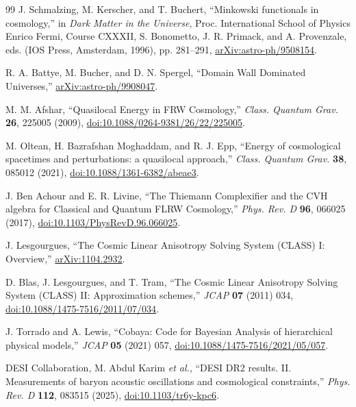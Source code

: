 \documentclass[aps,prd,reprint,onecolumn,nofootinbib,superscriptaddress,showkeys]{revtex4-2}
\numberwithin{equation}{section}
\theoremstyle{definition}
\theoremstyle{plain}
\begin{document}
\begin{thebibliography}{99}
J. Schmalzing, M. Kerscher, and T. Buchert,
``Minkowski functionals in cosmology,'' in \emph{Dark Matter in the Universe},
Proc. International School of Physics Enrico Fermi, Course CXXXII,
S. Bonometto, J. R. Primack, and A. Provenzale, eds. (IOS Press, Amsterdam, 1996), pp. 281--291,
\href{https://arxiv.org/abs/astro-ph/9508154}{arXiv:astro-ph/9508154}.

R. A. Battye, M. Bucher, and D. N. Spergel,
``Domain Wall Dominated Universes,''
\href{https://arxiv.org/abs/astro-ph/9908047}{arXiv:astro-ph/9908047}.

M. M. Afshar,
``Quasilocal Energy in FRW Cosmology,''
\emph{Class. Quantum Grav.} \textbf{26}, 225005 (2009),
\href{https://doi.org/10.1088/0264-9381/26/22/225005}{doi:10.1088/0264-9381/26/22/225005}.

M. Oltean, H. Bazrafshan Moghaddam, and R. J. Epp,
``Energy of cosmological spacetimes and perturbations: a quasilocal approach,''
\emph{Class. Quantum Grav.} \textbf{38}, 085012 (2021),
\href{https://doi.org/10.1088/1361-6382/abeae3}{doi:10.1088/1361-6382/abeae3}.

J. Ben Achour and E. R. Livine,
``The Thiemann Complexifier and the CVH algebra for Classical and Quantum FLRW Cosmology,''
\emph{Phys. Rev. D} \textbf{96}, 066025 (2017),
\href{https://doi.org/10.1103/PhysRevD.96.066025}{doi:10.1103/PhysRevD.96.066025}.

J. Lesgourgues,
``The Cosmic Linear Anisotropy Solving System (CLASS) I: Overview,''
\href{https://arxiv.org/abs/1104.2932}{arXiv:1104.2932}.

D. Blas, J. Lesgourgues, and T. Tram,
``The Cosmic Linear Anisotropy Solving System (CLASS) II: Approximation schemes,''
\emph{JCAP} \textbf{07} (2011) 034,
\href{https://doi.org/10.1088/1475-7516/2011/07/034}{doi:10.1088/1475-7516/2011/07/034}.

J. Torrado and A. Lewis,
``Cobaya: Code for Bayesian Analysis of hierarchical physical models,''
\emph{JCAP} \textbf{05} (2021) 057,
\href{https://doi.org/10.1088/1475-7516/2021/05/057}{doi:10.1088/1475-7516/2021/05/057}.

DESI Collaboration, M. Abdul Karim \emph{et al.},
``DESI DR2 results. II. Measurements of baryon acoustic oscillations and cosmological constraints,''
\emph{Phys. Rev. D} \textbf{112}, 083515 (2025),
\href{https://doi.org/10.1103/tr6y-kpc6}{doi:10.1103/tr6y-kpc6}.

\end{thebibliography}
\end{document}
